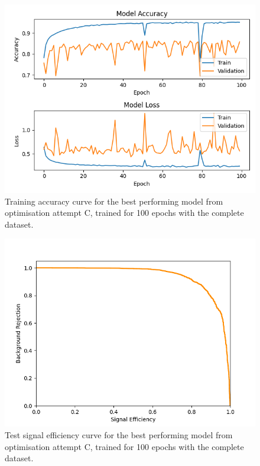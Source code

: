 \begin{figure}[h] 
        \centering \includegraphics[width=\columnwidth]{figures/6vimrcb1485481664trainlog.png}

        \caption{
                \label{fig:6vimrcb1485481664_trainlog} Training accuracy curve for the best performing model from optimisation attempt C, trained for 100 epochs with the complete dataset.
        }
\end{figure}

\begin{figure}[h] 
        \centering \includegraphics[width=\columnwidth]{figures/6vimrcb1485481664_sigeff.png}

        \caption{Test signal efficiency curve for the best performing model from optimisation attempt C, trained for 100 epochs with the complete dataset.
                \label{fig:6vimrcb1485481664_sigeff} 
        }
\end{figure}


